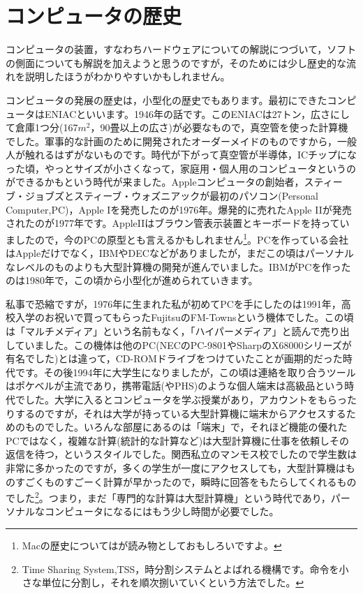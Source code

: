 \documentclass{ltjsbook}
\begin{document}
\section{コンピュータの歴史}
コンピュータの装置，すなわちハードウェアについての解説につづいて，ソフトの側面についても解説を加えようと思うのですが，そのためには少し歴史的な流れを説明したほうがわかりやすいかもしれません。

コンピュータの発展の歴史は，小型化の歴史でもあります。最初にできたコンピュータはENIACといいます。1946年の話です。このENIACは27トン，広さにして倉庫1つ分(167$m^2$，90畳以上の広さ)が必要なもので，真空管を使った計算機でした。軍事的な計画のために開発されたオーダーメイドのものですから，一般人が触れるはずがないものです。時代が下がって真空管が半導体，ICチップになった頃，やっとサイズが小さくなって，家庭用・個人用のコンピュータというのができるかもという時代が来ました。Appleコンピュータの創始者，スティーブ・ジョブズとスティーブ・ウォズニアックが最初のパソコン(Personal Computer,PC)，Apple Iを発売したのが1976年。爆発的に売れたApple IIが発売されたのが1977年です。AppleIIはブラウン管表示装置とキーボードを持っていましたので，今のPCの原型とも言えるかもしれません\footnote{Macの歴史については\textcite{Isaacson2012}が読み物としておもしろいですよ。}。PCを作っている会社はAppleだけでなく，IBMやDECなどがありましたが，まだこの頃はパーソナルなレベルのものよりも大型計算機の開発が進んでいました。IBMがPCを作ったのは1980年で，この頃から小型化が進められていきます。

私事で恐縮ですが，1976年に生まれた私が初めてPCを手にしたのは1991年，高校入学のお祝いで買ってもらったFujitsuのFM-Townsという機体でした。この頃は「マルチメディア」という名前もなく，「ハイパーメディア」と読んで売り出していました。この機体は他のPC(NECのPC-9801やSharpのX68000シリーズが有名でした)とは違って，CD-ROMドライブをつけていたことが画期的だった時代です。その後1994年に大学生になりましたが，この頃は連絡を取り合うツールはポケベルが主流であり，携帯電話(やPHS)のような個人端末は高級品という時代でした。大学に入るとコンピュータを学ぶ授業があり，アカウントをもらったりするのですが，それは大学が持っている大型計算機に端末からアクセスするためのものでした。いろんな部屋にあるのは「端末」で，それほど機能の優れたPCではなく，複雑な計算(統計的な計算など)は大型計算機に仕事を依頼しその返信を待つ，というスタイルでした。関西私立のマンモス校でしたので学生数は非常に多かったのですが，多くの学生が一度にアクセスしても，大型計算機はものすごくものすごーく計算が早かったので，瞬時に回答をもたらしてくれるものでした\footnote{Time Sharing System,TSS，時分割システムとよばれる機構です。命令を小さな単位に分割し，それを順次捌いていくという方法でした。}。つまり，まだ「専門的な計算は大型計算機」という時代であり，パーソナルなコンピュータになるにはもう少し時間が必要でした。
\end{document}
